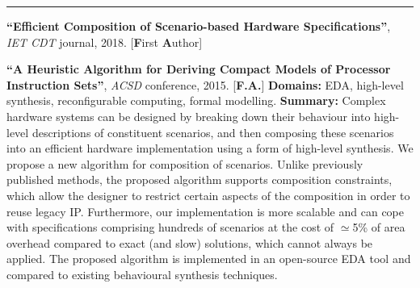 \vspace{-3mm}
\rule{\textwidth}{0.5pt}\vspace{-1mm}

\begin{cventries}
\vspace{-4mm}

\cventry
{} %
{} %
{} %
{} %
{ %
\begin{cvitems}
\item{\textbf{``Efficient Composition of Scenario-based Hardware 
Specifications''}, 
\textit{IET CDT} journal, 2018. [\textbf{F}irst \textbf{A}uthor]}
\item{\textbf{``A Heuristic Algorithm for Deriving Compact Models of Processor 
Instruction Sets''}, \textit{ACSD} conference, 2015. 
[\textbf{F.}\textbf{A.}]\newline}
\textbf{Domains:} EDA, high-level synthesis, reconfigurable 
computing, formal modelling.\newline
\textbf{Summary:} Complex hardware systems can be designed by breaking down
their behaviour into high-level descriptions of constituent scenarios, and then
composing these scenarios into an efficient hardware implementation using a form
of high-level synthesis. We propose a new algorithm for composition of
scenarios. Unlike previously published methods, the proposed algorithm supports
composition constraints, which allow the designer to restrict certain aspects of
the composition in order to reuse legacy IP. Furthermore, our implementation is
more scalable and can cope with specifications comprising hundreds of scenarios
at the cost of $\simeq$5\% of area overhead compared to exact (and slow) 
solutions, which cannot always be applied. The proposed algorithm is 
implemented in an open-source EDA tool and compared to existing behavioural 
synthesis techniques.
\end{cvitems}
}


\end{cventries}
